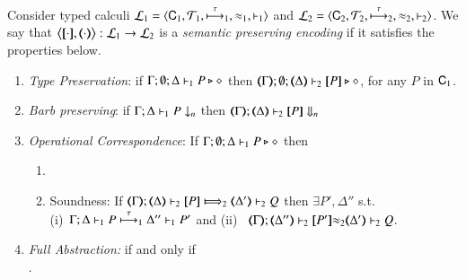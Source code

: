 \begin{definition}\rm
\label{def:ep}
       Consider typed calculi
        $\tyl{L}_1=\calc{\CAL_1}{{\cal{T}}_1}{\hby{\tau}_1}{\wb_1}{\proves_1}$
       and $\tyl{L}_2=\calc{\CAL_2}{{\cal{T}}_2}{\hby{\tau}_2}{\wb_2}{\proves_2}$.
We say that $\enco{\map{\cdot}, \mapt{\cdot}}: \tyl{L}_1 \to \tyl{L}_2$ is a \emph{semantic preserving encoding}
if it satisfies the properties below.
	
	\begin{enumerate}[1.]
		\item \emph{Type Preservation}:
	if
	$\Gamma; \emptyset; \Delta \proves_1 P \hastype \Proc$ then 
	$\mapt{\Gamma}; \emptyset; \mapt{\Delta} \proves_2 \map{P} \hastype \Proc$,  
	for any   $P$ in $\CAL_1$.

			\item \emph{Barb preserving}: if $\Gamma; \Delta \proves_1 P \barb{n}$
		then $\mapt{\Gamma}; \mapt{\Delta} \proves_2 \map{P} \Barb{n}$

	\item \emph{Operational Correspondence}: If $\Gamma; \emptyset; \Delta \proves_1 P \hastype \Proc$ then
		\begin{enumerate}
			\item	{}
				
			\item	Soundness:   
				If  $\wtytraargi{\mapt{\Gamma}}{}{\mapt{\Delta}}{\map{P}}{\mapt{\Delta'}}{Q}{2}{2}$
				then  $\exists P', \Delta''$ s.t.  \\
				(i)~$\stytraargi{\Gamma}{\tau}{\Delta}{P}{\Delta''}{P'}{1}{1}$
				and 
				(ii)~
${\mapt{\Gamma}};{\mapt{\Delta''}}\proves_2 {\map{P'}}{\wb_2}
{\mapt{\Delta'}}\proves_2 {Q}$.

		\end{enumerate}
		
		\item \emph{Full Abstraction:} 
		if and only if \\
		.
		
	\end{enumerate}
\end{definition}

